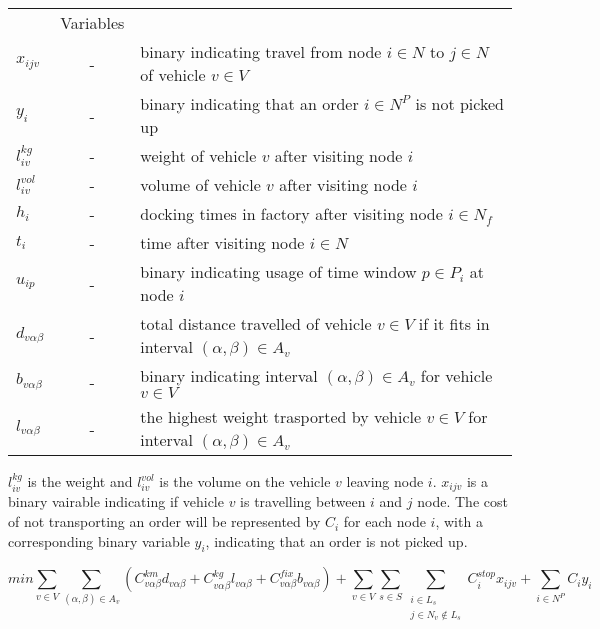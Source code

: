 \documentclass[a4paper,10pt]{article}
\begin{document}
\begin{tabular} {l c l}
    			&Variables										\\
	$x_{ijv}$	&-& 	binary indicating travel from node $i\in N$ to $j\in N$ of vehicle $v\in V$	\\
	$y_i$	        &-& 	binary indicating that an order $i\in N^P$ is not picked up             	\\
        $l_{iv}^{kg} $ 	&-& 	weight of vehicle $v$ after visiting node $i$        				\\
        $l_{iv}^{vol}$	&-&	volume of vehicle $v$ after visiting node $i$  					\\ 
	$h_i	$	&-&	docking times in factory after visiting node $i\in N_f$				\\
	$t_i 	$	&-&	time after visiting node $i\in N$						\\
	$u_{ip}	$	&-&	binary indicating usage of time window $p\in P_i$ at node $i$			\\
        $d_{v\alpha\beta} $	&-& 	total distance travelled of vehicle $v\in V$ if it fits in interval
                                                                                    $(\alpha, \beta) \in A_v$	\\
        $b_{v\alpha\beta} $	&-&	binary indicating interval $(\alpha, \beta) \in A_v$ for vehicle $v\in V$	\\
        $l_{v\alpha\beta}$ &-&	the highest weight trasported by vehicle $v \in V$ for interval $(\alpha,\beta) \in A_v$	\\

\end{tabular}
\linebreak
\linebreak
\par

$l_{iv}^{kg}$ is the weight and $l_{iv}^{vol}$ is the volume on the vehicle $v$ leaving node $i$. $x_{ijv}$ is a binary vairable indicating if vehicle $v$ is travelling between $i$ and $j$ node. 
The cost of not transporting an order will be represented by $C_i$ for each node $i$, with a corresponding binary variable $y_i$, indicating that an order is not picked up.

\begin{equation}
\label{eq:1}
        min\sum_{v\in V} \sum_{(\alpha, \beta) \in A_v} ( C^{km}_{v\alpha\beta}d_{v\alpha\beta} + C^{kg}_{v\alpha\beta}l_{v\alpha\beta} + C^{fix}_{v\alpha\beta}b_{v\alpha\beta} ) + \sum_{v\in V}\sum_{s\in S}\sum_{\substack{i \in L_s\\j \in N_v{\notin} L_s}}C^{stop}_ix_{ijv} + \sum_{i\in N^P}C_iy_i
\end{equation}
\end{document}
